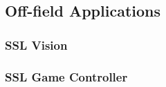 




\subsection{Off-field Applications}

\subsubsection{SSL Vision}


\subsubsection{SSL Game Controller}


\begin{comment}
In this section, you provide the knowledge the reader needs to understand your work and your contribution. Present fundamental knowledge needed to understand the field and the task. For example, you can explain relevant theories and concepts you use or introduce mathematical notation. Write the background so that someone familiar with the area can skip it. 
\end{comment}

